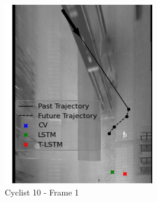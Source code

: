 \documentclass{article}
\begin{document}
\begin{figure}[H]
\begin{subfigure}{0.4\textwidth}
  \label{fig:ped-exit}
\end{subfigure}
\begin{subfigure}{0.40\textwidth}
  \centering
  \includegraphics[width=\linewidth]{quali_results/cyc-10.png}
  \caption{Cyclist 10 - Frame 1}
  \label{fig:cyc10}
\end{subfigure}
\begin{subfigure}{0.40\textwidth}
  \centering

\end{subfigure}
\end{figure}
\end{document}
